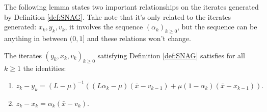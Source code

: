 \documentclass[12pt]{article}
\begin{document}
    The following lemma states two important relationships on the iterates generated by Definition \ref{def:SNAG}. 
    Take note that it's only related to the iterates generated: $x_k, y_k, v_k$, it involves the sequence $(\alpha_k)_{k \ge 0}$, but the sequence can be anything in between $(0, 1]$ and these relations won't change. 
    \begin{lemma}\label{lemma:snag-identities}
        The iterates $(y_k, x_k, v_k)_{k \ge0}$ satisfying Definition \ref{def:SNAG} satisfies for all $k \ge 1$ the identities: 
        \begin{enumerate}[nosep]
            \item $z_k - y_k = (L - \mu)^{-1}((L\alpha_k - \mu)(\bar x - v_{k - 1}) + \mu(1 - \alpha_k)(\bar x - x_{k - 1})).$
            \item $z_k - x_k = \alpha_k (\bar x - v_k).$
        \end{enumerate}
    \end{lemma}
\end{document}
